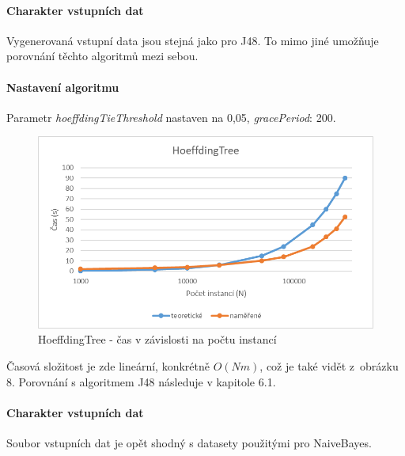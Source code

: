 \documentclass[12pt]{article}
\begin{document}
\newpage
{}
\paragraph{Charakter vstupních dat}
Vygenerovaná vstupní data jsou stejná jako pro J48. To mimo jiné umožňuje porovnání těchto algoritmů mezi sebou.
\paragraph{Nastavení algoritmu}
Parametr \textit{hoeffdingTieThreshold} nastaven na 0,05, \textit{gracePeriod}: 200.
\begin{figure}[hbp]
  \centering
  \includegraphics[scale=1]{img/ht.png}
  \caption{HoeffdingTree - čas v závislosti na počtu instancí}
\end{figure}
Časová složitost je zde lineární, konkrétně $O(Nm)$, což je také vidět z~obrázku 8. Porovnání s algoritmem J48 následuje v kapitole 6.1.

\newpage
{}
\paragraph{Charakter vstupních dat}
Soubor vstupních dat je opět shodný s datasety použitými pro NaiveBayes.
\end{document}
